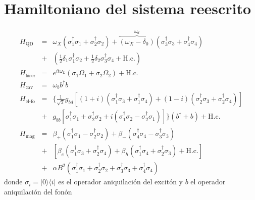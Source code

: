 \documentclass[../main.tex]{subfiles}
\begin{document}
\chapter{Hamiltoniano del sistema reescrito}
\begin{eqnarray}
	H_\text{QD} &=& \omega_X (\sigma_1^{\dagger }\sigma_1 + \sigma_2^\dagger\sigma_2) + \overbrace{(\omega_X-\delta_0)}^{\omega_d} (\sigma_3^\dagger\sigma_3 + \sigma_4^\dagger\sigma_4) \nonumber\\ &+& (\tfrac{1}{2}\delta_1 \sigma_1^\dagger\sigma_2 + \tfrac{1}{2}\delta_2\sigma_3^\dagger\sigma_4 + \text{H.c.})\\
	H_\text{láser}&=& e^{i t\omega_L}(\sigma_1 \Omega_1 + \sigma_2 \Omega_2) + \text{H.c.}\\
	H_\text{cav} &=&  \omega_b b^\dagger b\\
	H_\text{el-fo} &=&  \{\tfrac{1}{\sqrt{2}} g_{bd} [(1+i) (\sigma_1^\dagger\sigma_3 + \sigma_1^\dagger\sigma_4) + (1-i) (\sigma_2^\dagger\sigma_3 + \sigma_2^\dagger\sigma_4)] \nonumber\\
	&+& g_{bb} [\sigma_1^\dagger\sigma_1 + \sigma_2^\dagger\sigma_2 + i (\sigma_1^\dagger\sigma_2 - \sigma_2^\dagger\sigma_1)]\}(b^\dagger + b)  + \text{H.c.}\\
	H_\text{mag} &=& \beta_+(\sigma_1^\dagger\sigma_1 - \sigma_2^\dagger\sigma_2) + \beta_-(\sigma_4^\dagger\sigma_4 - \sigma_3^\dagger\sigma_3) \nonumber\\
	&+& [\beta_e (\sigma_1^\dagger\sigma_3 + \sigma_2^\dagger\sigma_4) + \beta_h (\sigma _1^\dagger\sigma_4 + \sigma_2^\dagger\sigma_3) + \text{H.c.}] \nonumber\\
	&+& \alpha  B^2(\sigma_1^\dagger\sigma_1 + \sigma_2^\dagger\sigma_2 + \sigma_3^\dagger\sigma_3 + \sigma_4^\dagger\sigma_4)
\end{eqnarray}
donde $\sigma_i = |0\rangle\langle i|$ es el operador aniquilación del excitón y $b$ el operador aniquilación del fonón
\end{document}
